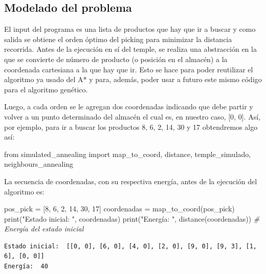 \documentclass[
]{article}
\newenvironment{Shaded}{}{}
\newcommand{\BuiltInTok}[1]{#1}
\newcommand{\CommentTok}[1]{\textcolor[rgb]{0.38,0.63,0.69}{\textit{#1}}}
\newcommand{\DecValTok}[1]{\textcolor[rgb]{0.25,0.63,0.44}{#1}}
\newcommand{\ImportTok}[1]{#1}
\newcommand{\NormalTok}[1]{#1}
\newcommand{\OperatorTok}[1]{\textcolor[rgb]{0.40,0.40,0.40}{#1}}
\newcommand{\StringTok}[1]{\textcolor[rgb]{0.25,0.44,0.63}{#1}}
\begin{document}
\hypertarget{modelado-del-problema}{%
\subsection{Modelado del problema}\label{modelado-del-problema}}

El input del programa es una lista de productos que hay que ir a buscar
y como salida se obtiene el orden óptimo del picking para minimizar la
distancia recorrida. Antes de la ejecución en sí del temple, se realiza
una abstracción en la que se convierte de número de producto (o posición
en el almacén) a la coordenada cartesiana a la que hay que ir. Esto se
hace para poder reutilizar el algoritmo ya usado del A* y para, además,
poder usar a futuro este mismo código para el algoritmo genético.

Luego, a cada orden se le agregan dos coordenadas indicando que debe
partir y volver a un punto determinado del almacén el cual es, en
nuestro caso, {[}0, 0{]}. Así, por ejemplo, para ir a buscar los
productos 8, 6, 2, 14, 30 y 17 obtendremos algo así:

\begin{Shaded}
\begin{Highlighting}[]
\ImportTok{from}\NormalTok{ simulated_annealing }\ImportTok{import}\NormalTok{ map_to_coord, distance, temple_simulado, neighbours_annealing}
\end{Highlighting}
\end{Shaded}

La secuencia de coordenadas, con su respectiva energía, antes de la
ejecución del algoritmo es:

\begin{Shaded}
\begin{Highlighting}[]
\NormalTok{pos_pick }\OperatorTok{=}\NormalTok{ [}\DecValTok{8}\NormalTok{, }\DecValTok{6}\NormalTok{, }\DecValTok{2}\NormalTok{, }\DecValTok{14}\NormalTok{, }\DecValTok{30}\NormalTok{, }\DecValTok{17}\NormalTok{]}
\NormalTok{coordenadas }\OperatorTok{=}\NormalTok{ map_to_coord(pos_pick)}
\BuiltInTok{print}\NormalTok{(}\StringTok{"Estado inicial: "}\NormalTok{, coordenadas)}
\BuiltInTok{print}\NormalTok{(}\StringTok{"Energía: "}\NormalTok{, distance(coordenadas)) }\CommentTok{# Energía del estado inicial}
\end{Highlighting}
\end{Shaded}

\begin{verbatim}
Estado inicial:  [[0, 0], [6, 0], [4, 0], [2, 0], [9, 0], [9, 3], [1, 6], [0, 0]]
Energía:  40
\end{verbatim}
\end{document}
